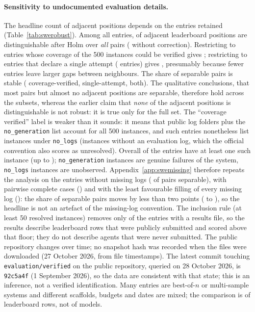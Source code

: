 \paragraph{Sensitivity to undocumented evaluation details.} The headline count of adjacent positions depends on the entries retained (Table~\ref{tab:swerobust}). Among all entries, \sweAllAdjHolm{} of adjacent leaderboard positions are distinguishable after Holm over \emph{all} pairs (\sweAllAdjRaw{} without correction). Restricting to entries whose coverage of the 500 instances could be verified gives \sweCovAdjHolm{}; restricting to entries that declare a single attempt (\sweNSingle{} entries) gives \sweSingleAdjHolm{}, presumably because fewer entries leave larger gaps between neighbours. The share of separable pairs is stable (\sweCovFracHolm{} coverage-verified, \sweSingleFracHolm{} single-attempt, \sweBothFracHolm{} both). The qualitative conclusions, that most pairs but almost no adjacent positions are separable, therefore hold across the subsets, whereas the earlier claim that \emph{none} of the adjacent positions is distinguishable is not robust: it is true only for the full set. The ``coverage verified'' label is weaker than it sounds: it means that public log folders plus the \texttt{no\_generation} list account for all 500 instances, and \sweNFolderCovWithNoLogs{} such entries nonetheless list instances under \texttt{no\_logs} (instances without an evaluation log, which the official convention also scores as unresolved). Overall \sweNNoLogs{} of the \sweNAgents{} entries have at least one such instance (up to \sweMaxNoLogs{}); \texttt{no\_generation} instances are genuine failures of the system, \texttt{no\_logs} instances are unobserved. Appendix~\ref{app:swemissing} therefore repeats the analysis on the \sweCompleteN{} entries without missing logs (\sweCompleteFracHolm{} of pairs separable), with pairwise complete cases (\sweCCFracHolm) and with the least favourable filling of every missing log (\sweRobustFracHolm): the share of separable pairs moves by less than two points (\sweRobustFracHolm{} to \sweCompleteFracHolm{}), so the headline is not an artefact of the missing-log convention. The inclusion rule (at least 50 resolved instances) removes only \sweNExcluded{} of the \sweNFiles{} entries with a results file, so the results describe leaderboard rows that were publicly submitted and scored above that floor; they do not describe agents that were never submitted. The public repository changes over time; no snapshot hash was recorded when the files were downloaded (27 October 2026, from file timestamps). The latest commit touching \texttt{evaluation/verified} on the public repository, queried on 28 October 2026, is \texttt{92c5a4f} (1 September 2026), so the data are consistent with that state; this is an inference, not a verified identification. Many entries are best-of-$n$ or multi-sample systems and different scaffolds, budgets and dates are mixed; the comparison is of leaderboard rows, not of models.

